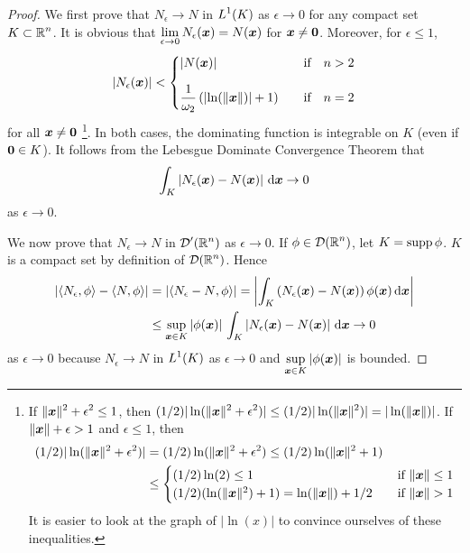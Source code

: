 \begin{proof}
We first prove that $N_\epsilon \rightarrow N$ in $\displaystyle L^1(K)$ as
$\epsilon \rightarrow 0$ for any compact set $\displaystyle K \subset \mathbb{R}^n$.
It is obvious that
$\displaystyle \lim_{\epsilon \rightarrow 0} N_\epsilon({\bm{x}}) = N({\bm{x}})$
for ${\bm{x}} \neq {\bm{0}}$.  Moreover, for $\epsilon \leq 1$,
\[
\left| N_\epsilon({\bm{x}}) \right| <
\begin{cases}
\displaystyle \left| N({\bm{x}})\right| & \quad \text{if} \quad n>2 \\[1em]
\displaystyle \frac{1}{\omega_2} \left( \left|\ln(\|{\bm{x}}\|)\right|+1 \right) 
& \quad \text{if} \quad n=2
\end{cases}
\]
for all ${\bm{x}} \neq {\bm{0}}$ \footnote{If
$\displaystyle \|{\bm{x}}\|^2+\epsilon^2 \leq 1$, then
$\displaystyle (1/2) |\ln(\|{\bm{x}}\|^2 + \epsilon^2)|  
\leq (1/2) |\ln(\|{\bm{x}}\|^2)| = |\ln(\|{\bm{x}}\|)|$.
If $\|{\bm{x}}\|+\epsilon > 1$ and $\epsilon\leq 1$, then
\begin{align*}
(1/2)|\ln(\|{\bm{x}}\|^2+\epsilon^2)|
&= (1/2)\ln(\|{\bm{x}}\|^2+\epsilon^2)
\leq (1/2)\ln(\|{\bm{x}}\|^2+1) \\
&\leq
\begin{cases}
(1/2) \ln(2) \leq 1 & \quad \text{if} \ \|{\bm{x}}\|\leq 1 \\
(1/2)(\ln(\|{\bm{x}}\|^2) + 1) = \ln(\|{\bm{x}}\|) + 1/2
& \quad \text{if} \ \|{\bm{x}}\| > 1
\end{cases}
\end{align*}
It is easier to look at the graph of $|\ln(x)|$ to convince ourselves
of these inequalities.}.  In both cases, the dominating
function is integrable on $K$ (even if ${\bm{0}} \in  K$).
It follows from the Lebesgue Dominate Convergence Theorem that
\[
\int_K \left| N_\epsilon({\bm{x}}) - N({\bm{x}}) \right| \,\mathrm{d}{{\bm{x}}}
\rightarrow 0
\]
as $\epsilon \rightarrow 0$.

We now prove that $N_\epsilon \rightarrow N$ in $\displaystyle \mathcal{D}'(\mathbb{R}^n)$ as
$\epsilon \rightarrow 0$.  If $\displaystyle \phi \in \mathcal{D}(\mathbb{R}^n)$,
let $K = \operatorname{supp} \phi$.
$K$ is a compact set by definition of $\displaystyle \mathcal{D}(\mathbb{R}^n)$.  Hence
\begin{align*}
\left| \left\langle{N_\epsilon} , {\phi}\right\rangle - \left\langle{N} , {\phi}\right\rangle \right|
&= \left| \left\langle{N_\epsilon - N} , {\phi}\right\rangle \right|
= \left| \int_K \left(N_\epsilon({\bm{x}}) - N({\bm{x}})\right)
\phi({\bm{x}}) \,\mathrm{d}{{\bm{x}}} \right| \\
&\leq  \sup_{{\bm{x}}\in K} \left|\phi({\bm{x}})\right| \,
\int_K \left|N_\epsilon({\bm{x}}) - N({\bm{x}})\right| \,\mathrm{d}{{\bm{x}}}
\rightarrow 0
\end{align*}
as $\epsilon \rightarrow 0$ because $N_\epsilon \rightarrow N$ in
$\displaystyle L^1(K)$ as $\epsilon \rightarrow 0$ and
$\displaystyle \sup_{{\bm{x}}\in K} \left|\phi({\bm{x}})\right|$ is bounded.


\end{proof}
